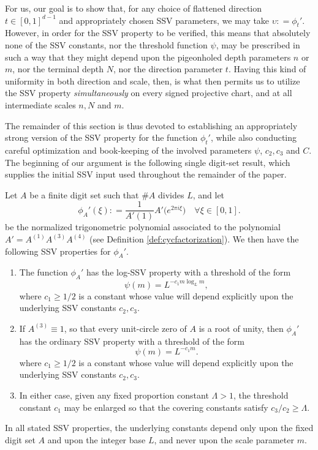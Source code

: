 \documentclass[12pt]{amsart}
\numberwithin{equation}{section}
\begin{document}
For us, our goal is to show that, for any choice of flattened direction $t \in [0,1]^{d-1}$ and appropriately chosen SSV parameters, we may take $\upsilon : = \phi_t'$. However, in order for the SSV property to be verified, this means that absolutely none of the SSV constants, nor the threshold function $\psi$, may be prescribed in such a way that they might depend upon the pigeonholed depth parameters $n$ or $m$, nor the terminal depth $N$, nor the direction parameter $t$. Having this kind of uniformity in both direction and scale, then, is what then permits us to utilize the SSV property \textit{simultaneously} on every signed projective chart, and at all intermediate scales $n,N$ and $m$. 

The remainder of this section is thus devoted to establishing an appropriately strong version of the SSV property for the function $\phi_t'$, while also conducting careful optimization and book-keeping of the involved parameters $\psi$, $c_2, c_3$ and $C$. The beginning of our argument is the following single digit-set result, which supplies the initial SSV input used throughout the remainder of the paper.

\begin{theorem}\label{thm:onedimensionalSSV}
Let $A$ be a finite digit set such that $\#A$ divides $L$, and let 
$$
\phi_A'(\xi) : = \frac{1}{A'(1)} A'\big(e^{2 \pi i \xi}\big) \quad \forall\xi \in [0,1].
$$
be the normalized trigonometric
polynomial associated to the polynomial $A'=A^{(1)}A^{(3)}A^{(4)}$ (see Definition \ref{def:cycfactorization}). We then have the following SSV properties for $\phi_{A}'$.

\begin{enumerate}
\item{
The function $\phi_A'$ has the
log-SSV property with a threshold of the form
\[
 \psi(m)=L^{-c_1m\log_Lm},
\]
where $c_1 \geq 1/2$ is a constant whose value will depend explicitly upon the underlying SSV constants $c_2, c_3$.}

\medskip

\item{If $A^{(3)}\equiv1$, so that every unit-circle zero of $A$ is a root of unity,
then $\phi_A'$ has the ordinary SSV property with a threshold of the form
\[
 \psi(m)=L^{-c_1m}.
\]
where $c_1 \geq 1/2$ is a constant whose value will depend explicitly upon the underlying SSV constants $c_2, c_3$.
}
\medskip

\item{In either case, given any fixed proportion constant $\Lambda>1$, the threshold constant $c_1$ may
be enlarged so that the covering constants satisfy $c_3/c_2 \geq\Lambda$.
}
\end{enumerate}
\noindent
In all stated SSV properties, the underlying constants depend only upon the fixed digit set $A$ and upon the integer base $L$, and never upon the scale parameter $m$.
\end{theorem}
\end{document}
